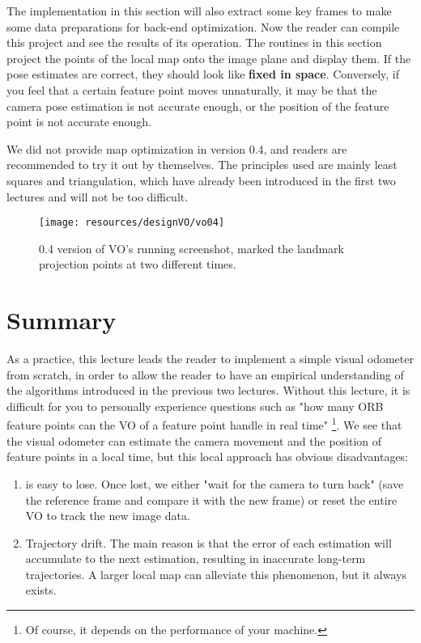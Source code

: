 The implementation in this section will also extract some key frames to make some data preparations for back-end optimization. Now the reader can compile this project and see the results of its operation. The routines in this section project the points of the local map onto the image plane and display them. If the pose estimates are correct, they should look like \textbf{fixed in space}. Conversely, if you feel that a certain feature point moves unnaturally, it may be that the camera pose estimation is not accurate enough, or the position of the feature point is not accurate enough.

We did not provide map optimization in version 0.4, and readers are recommended to try it out by themselves. The principles used are mainly least squares and triangulation, which have already been introduced in the first two lectures and will not be too difficult.

\begin{figure}[!htp]
\centering
\texttt{[image: resources/designVO/vo04]}
\caption{0.4 version of VO's running screenshot, marked the landmark projection points at two different times. }
\label{fig: vo04exp}
\end{figure}

\section{Summary}

As a practice, this lecture leads the reader to implement a simple visual odometer from scratch, in order to allow the reader to have an empirical understanding of the algorithms introduced in the previous two lectures. Without this lecture, it is difficult for you to personally experience questions such as "how many ORB feature points can the VO of a feature point handle in real time" \footnote{Of course, it depends on the performance of your machine. }. We see that the visual odometer can estimate the camera movement and the position of feature points in a local time, but this local approach has obvious disadvantages:

\begin{enumerate}
\item is easy to lose. Once lost, we either "wait for the camera to turn back" (save the reference frame and compare it with the new frame) or reset the entire VO to track the new image data.
\item Trajectory drift. The main reason is that the error of each estimation will accumulate to the next estimation, resulting in inaccurate long-term trajectories. A larger local map can alleviate this phenomenon, but it always exists.
\end{enumerate}

